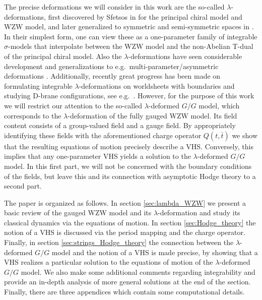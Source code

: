 \documentclass[11pt,a4paper]{article}
\numberwithin{equation}{section}
\numberwithin{table}{section}\setlength{\multlinegap}{25pt}
\begin{document}
The precise deformations we will consider in this work are the so-called $\lambda$-deformations, first discovered by Sfetsos in \cite{Sfetsos:2014_integrability} for the principal chiral model and WZW model, and later generalized to symmetric and semi-symmetric spaces in \cite{Hollowood:2014,Hollowood:2014qma}. In their simplest form, one can view these as a one-parameter family of integrable $\sigma$-models that interpolate between the WZW model and the non-Abelian T-dual of the principal chiral model. Also the $\lambda$-deformations have seen considerable development and generalizations to e.g.~multi-parameter/asymmetric deformations \cite{Sfetsos:2015nya,Georgiou:2016urf,Georgiou:2018gpe,Driezen:2019ykp}. Additionally, recently great progress has been made on formulating integrable $\lambda$-deformations on worldsheets with boundaries and studying D-brane configurations, see e.g.~\cite{Alekseev:1998mc,Felder:1999ka,Figueroa-OFarrill:1999cmq,Driezen:2018glg,Sfetsos:2021pcs}. However, for the purpose of this work we will restrict our attention to the so-called $\lambda$-deformed $G/G$ model, which corresponds to the $\lambda$-deformation of the fully gauged WZW model. Its field content consists of a group-valued field and a gauge field. By appropriately identifying these fields with the aforementioned charge operator $Q(t,\bar{t})$ we show that the resulting equations of motion precisely describe a VHS. Conversely, this implies that any one-parameter VHS yields a solution to the $\lambda$-deformed $G/G$ model. In this first part, we will not be concerned with the boundary conditions of the fields, but leave this and its connection with asymptotic Hodge theory to a second part.

The paper is organized as follows. In section \ref{sec:lambda_WZW} we present a basic review of the gauged WZW model and its $\lambda$-deformation and study its classical dynamics via the equations of motion. In section \ref{sec:Hodge_theory} the notion of a VHS is discussed via the period mapping and the charge operator. Finally, in section \ref{sec:strings_Hodge_theory} the connection between the $\lambda$-deformed $G/G$ model and the notion of a VHS is made precise, by showing that a VHS realizes a particular solution to the equations of motion of the $\lambda$-deformed $G/G$ model. We also make some additional comments regarding integrability and provide an in-depth analysis of more general solutions at the end of the section. Finally, there are three appendices which contain some computational details.
\end{document}

